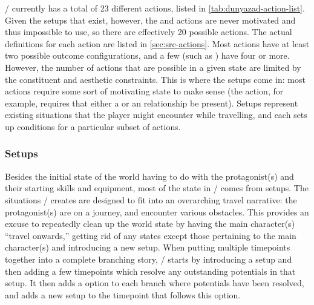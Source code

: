 \dunyazad/ currently has a total of 23 different actions, listed in \cref{tab:dunyazad-action-list}.
%
Given the setups that exist, however, the   and  actions are never motivated and thus impossible to use, so there are effectively 20 possible actions.
%
The actual definitions for each action are listed in \cref{sec:src-actions}.
%
Most actions have at least two possible outcome configurations, and a few (such as ) have four or more.
%
However, the number of actions that are possible in a given state are limited by the constituent and aesthetic constraints.
%
This is where the setups come in: most actions require some sort of motivating state to make sense (the  action, for example, requires that either a  or an  relationship be present).
%
Setups represent existing situations that the player might encounter while travelling, and each sets up conditions for a particular subset of actions.


\subsubsection{Setups}

Besides the initial state of the world having to do with the protagonist(s) and their starting skills and equipment, most of the state in \dunyazad/ comes from setups.
%
The situations \dunyazad/ creates are designed to fit into an overarching travel narrative: the protagonist(s) are on a journey, and encounter various obstacles.
%
This provides an excuse to repeatedly clean up the world state by having the main character(s) ``travel onwards,'' getting rid of any states except those pertaining to the main character(s) and introducing a new setup.
%
When putting multiple timepoints together into a complete branching story, \dunyazad/ starts by introducing a setup and then adding a few timepoints which resolve any outstanding potentials in that setup.
%
It then adds a  option to each branch where potentials have been resolved, and adds a new setup to the timepoint that follows this option.



